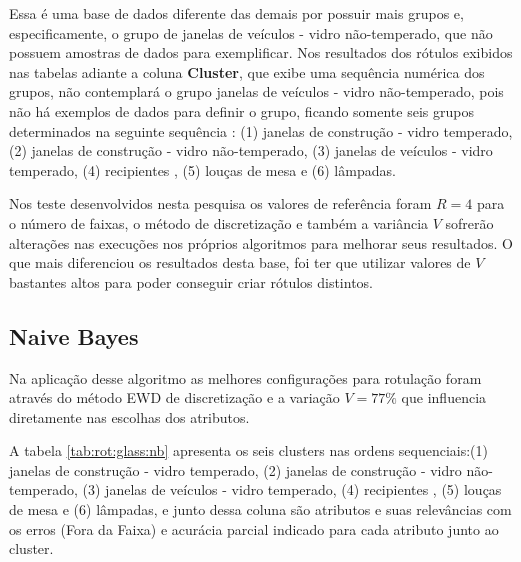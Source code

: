 Essa é uma base de dados diferente das demais por possuir mais grupos e, especificamente, o grupo de janelas de veículos - vidro não-temperado, que não possuem amostras de dados para exemplificar. Nos resultados dos rótulos exibidos nas tabelas adiante a coluna \textbf{Cluster}, que exibe uma sequência numérica dos grupos, não contemplará o grupo janelas de veículos - vidro não-temperado, pois não há exemplos de dados para definir o grupo, ficando somente seis grupos determinados na seguinte sequência : (1) janelas de construção - vidro temperado, (2) janelas de construção - vidro não-temperado, (3) janelas de veículos - vidro temperado, (4) recipientes , (5) louças de mesa e (6) lâmpadas. 

Nos teste desenvolvidos nesta pesquisa os valores de referência foram ${R=4}$ para o número de faixas, o método de discretização  e também a variância ${V}$ sofrerão alterações nas execuções nos próprios algoritmos para melhorar seus resultados. O que mais diferenciou os resultados desta base, foi ter que utilizar valores de ${V}$ bastantes altos para poder conseguir criar rótulos distintos.


\subsection{Naive Bayes} \label{cap:resultados:ssec:glass:nb}


Na aplicação desse algoritmo as melhores configurações para rotulação foram através do método EWD de discretização e a variação ${V=77\%}$ que influencia diretamente nas escolhas dos atributos. 


 A tabela \ref{tab:rot:glass:nb}  apresenta os seis clusters nas ordens sequenciais:(1) janelas de construção - vidro temperado, (2) janelas de construção - vidro não-temperado, (3) janelas de veículos - vidro temperado, (4) recipientes , (5) louças de mesa e (6) lâmpadas, e junto dessa coluna são atributos e suas relevâncias com os erros (Fora da Faixa) e acurácia parcial indicado para cada atributo junto ao cluster.

